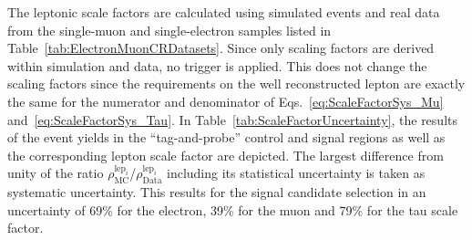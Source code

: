 The leptonic scale factors are calculated using simulated \Zlep events and real data from the single-muon and single-electron samples listed in Table~\ref{tab:ElectronMuonCRDatasets}.
Since only scaling factors are derived within simulation and data, no trigger is applied.
This does not change the scaling factors since the requirements on the well reconstructed lepton are exactly the same for the numerator and denominator of Eqs.~\eqref{eq:ScaleFactorSys_Mu} and~\eqref{eq:ScaleFactorSys_Tau}.
In Table~\ref{tab:ScaleFactorUncertainty}, the results of the event yields in the ``tag-and-probe'' control and signal regions as well as the corresponding lepton scale factor are depicted.
The largest difference from unity of the ratio $\rho^{\text{lep}_i}_{\text{MC}}$/$\rho^{\text{lep}_i}_{\text{Data}}$ including its statistical uncertainty is taken as systematic uncertainty. 
This results for the signal candidate selection in an uncertainty of 69\% for the electron, 39\% for the muon and 79\% for the tau scale factor.

